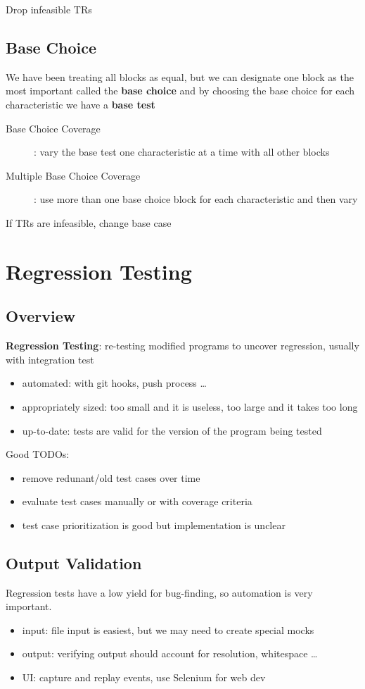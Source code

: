 \documentclass[]{article}
\theoremstyle{definition}
\begin{document}
		Drop infeasible TRs

		\subsection{Base Choice}
		We have been treating all blocks as equal, but we can designate one block as the most important called the \textbf{base choice}
		and by choosing the base choice for each characteristic we have a \textbf{base test}

	\begin{description}
		\item[Base Choice Coverage]: vary the base test one characteristic at a time with all other blocks
		\item[Multiple Base Choice Coverage]: use more than one base choice block for each characteristic and then vary
	\end{description}

	If TRs are infeasible, change base case

		


	

	\section{Regression Testing}
	\subsection{Overview}
	\textbf{Regression Testing}: re-testing modified programs to uncover regression, usually with integration test
	\begin{itemize}
		\item automated: with git hooks, push process \dots
		\item appropriately sized: too small and it is useless, too large and it takes too long
		\item up-to-date: tests are valid for the version of the program being tested
	\end{itemize}

	Good TODOs:
	\begin{itemize}
		\item remove redunant/old test cases over time
		\item evaluate test cases manually or with coverage criteria
		\item test case prioritization is good but implementation is unclear
	\end{itemize}

	\subsection{Output Validation}
	Regression tests have a low yield for bug-finding, so automation is very important.
	\begin{itemize}
		\item input: file input is easiest, but we may need to create special mocks
		\item output: verifying output should account for resolution, whitespace \dots
		\item UI: capture and replay events, use Selenium for web dev
	\end{itemize}
\end{document}
